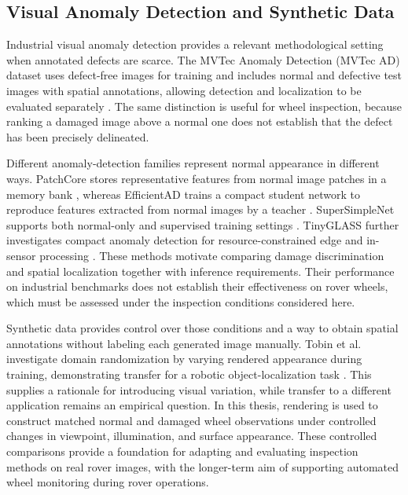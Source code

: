 \subsection{Visual Anomaly Detection and Synthetic Data}

Industrial visual anomaly detection provides a relevant methodological setting when annotated defects are scarce. The MVTec Anomaly Detection (MVTec AD) dataset uses defect-free images for training and includes normal and defective test images with spatial annotations, allowing detection and localization to be evaluated separately \cite{bergmann2019mvtec}. The same distinction is useful for wheel inspection, because ranking a damaged image above a normal one does not establish that the defect has been precisely delineated.

Different anomaly-detection families represent normal appearance in different ways. PatchCore stores representative features from normal image patches in a memory bank \cite{roth2022patchcore}, whereas EfficientAD trains a compact student network to reproduce features extracted from normal images by a teacher \cite{batzner2024efficientad}. SuperSimpleNet supports both normal-only and supervised training settings \cite{rolih2025supersimplenet}. TinyGLASS further investigates compact anomaly detection for resource-constrained edge and in-sensor processing \cite{bonazzi2026tinyglass}. These methods motivate comparing damage discrimination and spatial localization together with inference requirements. Their performance on industrial benchmarks does not establish their effectiveness on rover wheels, which must be assessed under the inspection conditions considered here.

Synthetic data provides control over those conditions and a way to obtain spatial annotations without labeling each generated image manually. Tobin et al. investigate domain randomization by varying rendered appearance during training, demonstrating transfer for a robotic object-localization task \cite{tobin2017domain}. This supplies a rationale for introducing visual variation, while transfer to a different application remains an empirical question. In this thesis, rendering is used to construct matched normal and damaged wheel observations under controlled changes in viewpoint, illumination, and surface appearance. These controlled comparisons provide a foundation for adapting and evaluating inspection methods on real rover images, with the longer-term aim of supporting automated wheel monitoring during rover operations.

